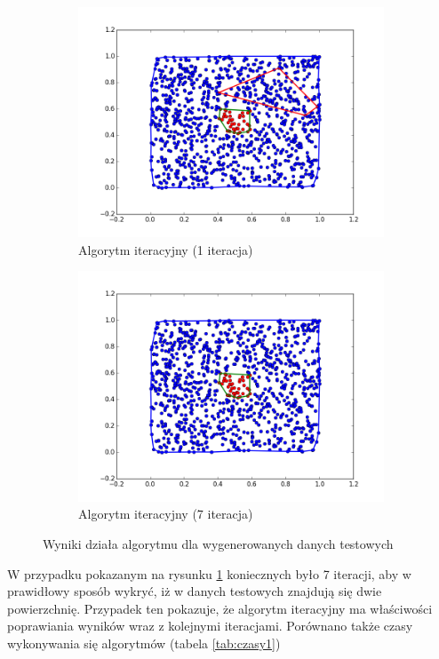 \begin{figure}[h!]
    \begin{subfigure}[b]{0.5\linewidth}
        \includegraphics[width=\linewidth]{img/test2_3.png}
        \caption{Algorytm iteracyjny (1 iteracja)}
    \end{subfigure}%
    \begin{subfigure}[b]{0.5\linewidth}
        \includegraphics[width=\linewidth]{img/test2_4.png}
        \caption{Algorytm iteracyjny (7 iteracja)}
    \end{subfigure}%
    \caption{Wyniki działa algorytmu dla wygenerowanych danych testowych}
    \label{fig:test2}
\end{figure}

W przypadku pokazanym na rysunku \ref{fig:test2} koniecznych było 7 iteracji, aby w prawidłowy sposób wykryć, iż
w danych testowych znajdują się dwie powierzchnię. Przypadek ten pokazuje, że algorytm iteracyjny ma właściwości
poprawiania wyników wraz z kolejnymi iteracjami. Porównano także czasy wykonywania się algorytmów (tabela \ref{tab:czasy1})

